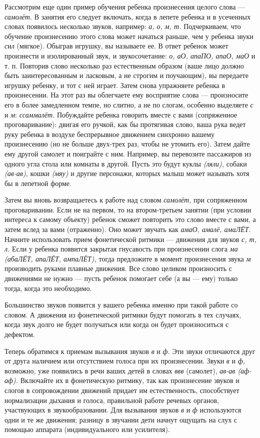 \documentclass{book}
\renewcommand{\emph}[1]{\textit{#1}}
\begin{document}
Рассмотрим еще один пример обучения ребенка произнесения целого слова
--- \emph{самолёт.} В занятия его следует включать, когда в лепете
ребенка и в усеченных словах появилось несколько звуков, например:
\emph{а, о, м, т.} Подчеркиваем, что обучение произнесению этого слова
может начаться раньше, чем у ребенка звуки \emph{с}и\emph{л} (мягкое).
Обыграв игрушку, вы называете ее. В ответ ребенок может произнести и
изолированный звук, и звукосочетание: \emph{о, аО, апаПО, апаО, маО} и
т. п. Повторив слово несколько раз естественным образом (ваше лицо
должно быть заинтересованным и ласковым, а не строгим и поучающим), вы
передаете игрушку ребенку, и тот с ней играет. Затем снова упражняете
ребенка в произнесении. На этот раз вы облегчаете ему восприятие слова
--- произносите его в более замедленном темпе, но слитно, а не по
слогам, особенно выделяете \emph{с} и \emph{м}: \emph{ссаммалёт.}
Побуждайте ребенка говорить вместе с вами (сопряженное проговаривание):
двигая его ручкой, как бы протягивая слово, ваша рука ведет руку ребенка
в воздухе беспрерывное движением синхронно вашему произнесению (но не
больше двух-трех раз, чтобы не утомить его). Затем дайте ему другой
самолет и поиграйте с ним. Например, вы перевозите пассажиров из одного
угла стола или комнаты в другой. Пусть это будут куклы \emph{(ляли),}
собаки \emph{(ав-ав),} кошки \emph{(мяу)} и другие персонажи, которых
малыш может называть хотя бы в лепетной форме.

Затем вы вновь возвращаетесь к работе над словом \emph{самолёт,} при
сопряженном проговаривании. Если не на первом, то на втором-третьем
занятии (при условии интереса к самому объекту) ребенок сможет повторить
это слово вместе с вами, а затем вслед за вами (отраженно). Оно может
звучать как \emph{амаО, амалё, амаЛЁТ.} Начните использовать прием
фонетической ритмики --- движения для звуков \emph{с, т, л.} Если у
ребенка появится закрытая гнусавость при произнесении слога \emph{ма
(абаЛЁТ, апаЛЁТ, ампаЛЁТ),} тогда предложите в момент произнесения звука
\emph{м} производить руками плавные движения. Все слово целиком
произносить с движениями не нужно --- пусть ребенок помогает себе (а вы
--- ему) только тогда, когда это необходимо.

Большинство звуков появится у вашего ребенка именно при такой работе со
словом. А движения из фонетической ритмики будут помогать в тех случаях,
когда звук долго не будет получаться или когда он будет произноситься с
дефектом.

Теперь обратимся к приемам вызывания звуков \emph{в} и \emph{ф.} Эти
звуки отличаются друг от друга наличием или отсутствием голоса при их
произнесении. Звуки \emph{в} и \emph{ф,} возможно, уже появились в речи
ваших детей в словах \emph{ввв} (самолет), \emph{ав-ав (аф-аф).}
Включайте их в фонетическую ритмику, так как произнесение звуков и
слогов в сопровождении движений придает им естественность, способствует
нормализации дыхания и голоса, правильной работе речевых органов,
участвующих в звукообразовании. Для вызывания звуков \emph{в} и \emph{ф}
используются одни и те же движения; разницу в звучании дети начнут
ощущать на слух с помощью аппарата (индивидуального или усилителя).
\end{document}
